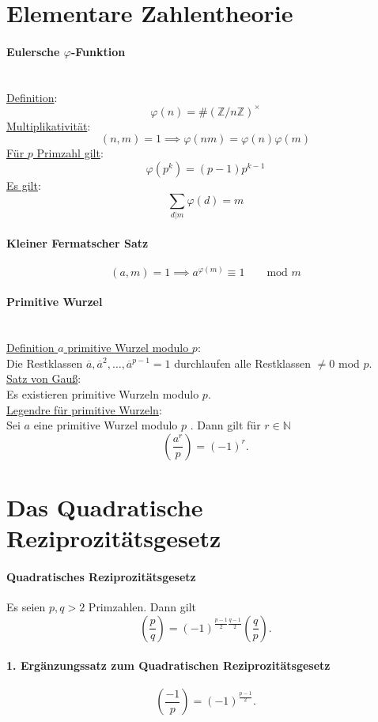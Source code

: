 \documentclass{article}
\begin{document}
\section{Elementare Zahlentheorie}

\paragraph{Eulersche \(\varphi\)-Funktion}\ \\
\underline{Definition}:
$$\varphi(n) = \#(\mathbb{Z}/n\mathbb{Z})^\times$$
\underline{Multiplikativität}:
$$(n,m) = 1 \implies \varphi(nm) = \varphi(n)\varphi(m)$$
\underline{Für $p$ Primzahl gilt}:
$$\varphi(p^k) = (p-1)p^{k-1}$$
\underline{Es gilt}:
$$\sum_{d|m} \varphi(d) = m$$

\paragraph{Kleiner Fermatscher Satz}
$$(a,m) = 1 \implies a^{\varphi(m)} \equiv 1\qquad \text{mod } m$$

\paragraph{Primitive Wurzel}\ \\
\underline{Definition $a$ primitive Wurzel modulo $p$}:\\
Die Restklassen $\overline a, \overline a^2, \dots, \overline a^{p-1} = 1$ durchlaufen alle Restklassen $\neq 0$ mod $p$.\\
\underline{Satz von Gauß}:\\
Es existieren primitive Wurzeln modulo $p$.\\
\underline{Legendre für primitive Wurzeln}:\\
Sei $a$ eine primitive Wurzel modulo $p$ . Dann gilt für $r\in \mathbb{N}$ 
$$ \left(\frac{a^r}{p} \right)= (-1)^r .$$

\section{Das Quadratische Reziprozitätsgesetz}
\paragraph{Quadratisches Reziprozitätsgesetz}
Es seien $p,q> 2$ Primzahlen. Dann gilt
$$\left(\frac{p}{q}\right) = (-1)^{\frac{p-1}{2}\frac{q-1}{2}} \left(\frac{q}{p}\right).$$

\paragraph{1. Ergänzungssatz zum Quadratischen Reziprozitätsgesetz}
$$\left(\frac{-1}{p}\right) = (-1)^{\frac{p-1}{2}}.$$
\end{document}
